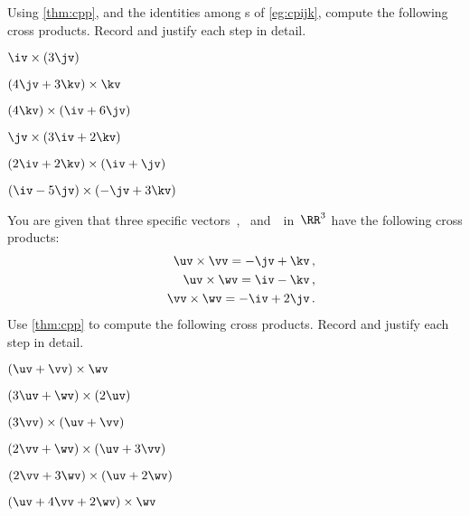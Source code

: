 \begin{exercise} \label{ex:} 
Using \autoref{thm:cpp}, and the identities among s of \autoref{eg:cpijk}, compute the following cross products.
Record and justify each step in detail.
\begin{parts}
\item \(\iv\times(3\jv)\)
\answer{\(3\kv\)}
\item \((4\jv+3\kv)\times\kv\)
\answer{\(4\iv\)}
\item \((4\kv)\times(\iv+6\jv)\)
\answer{\(-24\iv +4\jv\)}
\item \(\jv\times(3\iv+2\kv)\)
\answer{\(2\iv-3\kv\)}
\item \((2\iv+2\kv)\times(\iv+\jv)\)
\answer{\(-2\iv +2\jv +2\kv\)}
\item \((\iv-5\jv)\times(-\jv+3\kv)\)
\answer{\(-15\iv-3\jv-\kv\)}
\end{parts}
\end{exercise}




\begin{exercise} \label{ex:} 
You are given that three specific vectors~\uv, \vv\ and~\wv\ in~\(\RR^3\) have the following cross products:
\begin{eqnarray*}
&&\uv\times\vv=-\jv+\kv\,,
\\&&\uv\times\wv=\iv-\kv\,,
\\&&\vv\times\wv=-\iv+2\jv\,.
\end{eqnarray*}
Use \autoref{thm:cpp} to compute the following cross products.
Record and justify each step in detail.

\begin{parts}
\item \((\uv+\vv)\times\wv\)
\answer{\(2\jv -\kv\)}
\item \((3\uv+\wv)\times(2\uv)\)
\answer{\(-2\iv+2\kv\)}
\item \((3\vv)\times(\uv+\vv)\)
\answer{\(3\jv -3\kv\)}
\item \((2\vv+\wv)\times(\uv+3\vv)\)
\answer{\(2\iv -4\jv -\kv\)}
\item \((2\vv+3\wv)\times(\uv+2\wv)\)
\answer{\(-7\iv +10\jv +\kv\)}
\item \((\uv+4\vv+2\wv)\times\wv\)
\answer{\(-3\iv +8\jv -\kv\)}
\end{parts}
\end{exercise}







